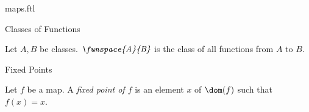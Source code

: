 \documentclass{naproche-library}
\begin{document}
\begin{smodule}[title=Maps]{maps.ftl}
\begin{sfragment}{Classes of Functions}
  \begin{definition}[forthel,id=FOUNDATIONS_06_5119110467813376]
    Let $A, B$ be classes.
    $\emph{\funspace{A}{B}}$ is the class of all functions from $A$ to $B$.
  \end{definition}
\end{sfragment}

\begin{sfragment}{Fixed Points}
  \begin{definition}[forthel,id=FOUNDATIONS_06_2177076576649216]
    Let $f$ be a map.
    A \emph{fixed point of $f$} is an element $x$ of $\dom(f)$ such that $f(x) = x$.
  \end{definition}
\end{sfragment}
\end{smodule}
\end{document}
